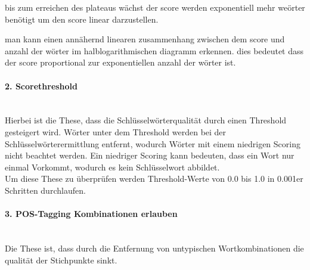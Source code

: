 bis zum erreichen des plateaus wächst der score werden exponentiell mehr weörter benötigt um den score linear darzustellen.


man kann einen annähernd linearen zusammenhang zwischen dem score und anzahl der wörter im halblogarithmischen diagramm erkennen. dies bedeutet dass der score proportional zur exponentiellen anzahl der wörter ist.

\paragraph{2. Scorethreshold}\mbox{}\\
Hierbei ist die These, dass die Schlüsselwörterqualität durch einen Threshold gesteigert wird. Wörter unter dem Threshold werden bei der Schlüsselwörterermittlung entfernt, wodurch Wörter mit einem niedrigen Scoring nicht beachtet werden. Ein niedriger Scoring kann bedeuten, dass ein Wort nur einmal Vorkommt, wodurch es kein Schlüsselwort abbildet.\\

Um diese These zu überprüfen werden Threshold-Werte von 0.0 bis 1.0 in 0.001er Schritten durchlaufen.

\paragraph{3. POS-Tagging Kombinationen erlauben}\mbox{}\\
Die These ist, dass durch die Entfernung von untypischen Wortkombinationen die qualität der Stichpunkte sinkt. %

